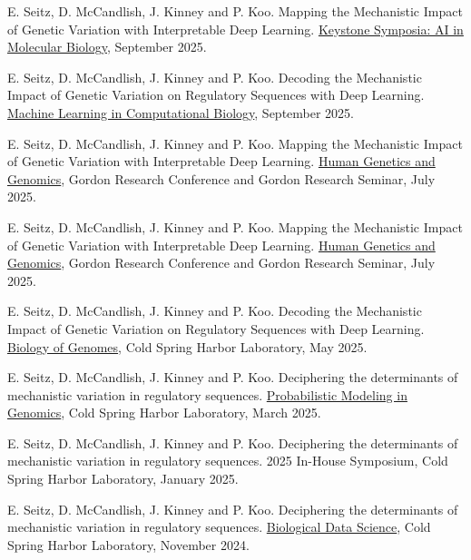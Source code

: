 \documentclass[10pt]{article}
\begin{document}
		\begin{bibenum}
			\item E. Seitz, D. McCandlish, J. Kinney and P. Koo. Mapping the Mechanistic Impact of Genetic Variation with Interpretable Deep Learning. \href{https://www.keystonesymposia.org/conferences/conference-listing/meeting/g22026}{Keystone Symposia: AI in Molecular Biology}, September 2025.
			
			\item E. Seitz, D. McCandlish, J. Kinney and P. Koo. Decoding the Mechanistic Impact of Genetic Variation on Regulatory Sequences with Deep Learning. \href{https://www.mlcb.org/}{Machine Learning in Computational Biology}, September 2025.
			
			\item E. Seitz, D. McCandlish, J. Kinney and P. Koo. Mapping the Mechanistic Impact of Genetic Variation with Interpretable Deep Learning. \href{https://www.grc.org/human-genetics-and-genomics-conference/2025/}{Human Genetics and Genomics}, Gordon Research Conference and Gordon Research Seminar, July 2025.
			
			\item E. Seitz, D. McCandlish, J. Kinney and P. Koo. Mapping the Mechanistic Impact of Genetic Variation with Interpretable Deep Learning. \href{https://www.grc.org/human-genetics-and-genomics-conference/2025/}{Human Genetics and Genomics}, Gordon Research Conference and Gordon Research Seminar, July 2025.
			
			\item E. Seitz, D. McCandlish, J. Kinney and P. Koo. Decoding the Mechanistic Impact of Genetic Variation on Regulatory Sequences with Deep Learning. \href{https://meetings.cshl.edu/abstracts.aspx?meet=GENOME&year=25}{Biology of Genomes}, Cold Spring Harbor Laboratory, May 2025.
			
			\item E. Seitz, D. McCandlish, J. Kinney and P. Koo. Deciphering the determinants of mechanistic variation in regulatory sequences. \href{https://meetings.cshl.edu/meetings.aspx?meet=PROBGEN&year=25}{Probabilistic Modeling in Genomics}, Cold Spring Harbor Laboratory, March 2025.
			
			\item E. Seitz, D. McCandlish, J. Kinney and P. Koo. Deciphering the determinants of mechanistic variation in regulatory sequences. 2025 In-House Symposium, Cold Spring Harbor Laboratory, January 2025.
			
			\item E. Seitz, D. McCandlish, J. Kinney and P. Koo. Deciphering the determinants of mechanistic variation in regulatory sequences. \href{https://meetings.cshl.edu/meetings.aspx?meet=DATA&year=24}{Biological Data Science}, Cold Spring Harbor Laboratory, November 2024.
			

\end{bibenum}
\end{document}
